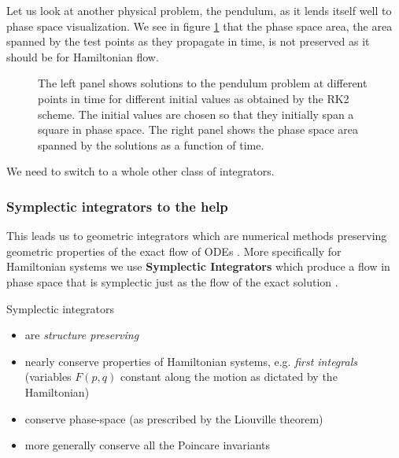 Let us look at another physical problem, the pendulum, as it lends itself well to phase space visualization. We see in figure \ref{fig:pend_phase_rk2} that the phase space area, the area spanned by the test points as they propagate in time, is not preserved as it should be for Hamiltonian flow.

\begin{figure}[!htb]
  \centering
  \hfill
  \caption{The left panel shows solutions to the pendulum problem at different points in time for different initial values as obtained by the RK2 scheme. The initial values are chosen so that they initially span a square in phase space. The right panel shows the phase space area spanned by the solutions as a function of time.}
  \label{fig:pend_phase_rk2}
\end{figure}

We need to switch to a whole other class of integrators.

\subsubsection{Symplectic integrators to the help}
\label{sec:symplectic_integrators}

This leads us to geometric integrators which are numerical methods preserving geometric properties of the exact flow of ODEs \citep{Hairer06}. More specifically for Hamiltonian systems we use \textbf{Symplectic Integrators} which produce a flow in phase space that is symplectic just as the flow of the exact solution \citep[chapter VI]{Hairer06}.

Symplectic integrators

\begin{itemize}
  \item are \textit{structure preserving}
  \item nearly conserve properties of Hamiltonian systems, e.g. \textit{first integrals} (variables $F(p,q)$ constant along the motion as dictated by the Hamiltonian)
  \item conserve phase-space (as prescribed by the Liouville theorem)
  \item more generally conserve all the Poincare invariants
\end{itemize}


